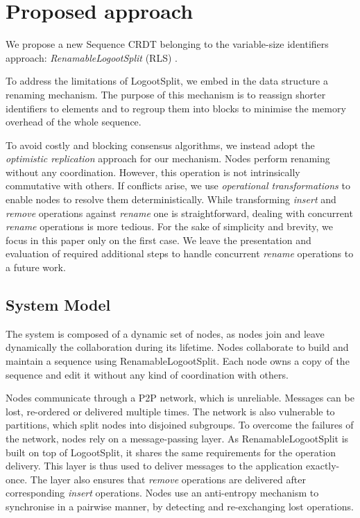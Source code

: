 \documentclass[sigplan,10pt]{acmart}
\begin{document}
\section{Proposed approach}
\label{sec:proposition}

We propose a new Sequence \ac{CRDT} belonging to the variable-size identifiers approach: \emph{RenamableLogootSplit} (RLS) \cite{nicolas:hal-01932552}.

To address the limitations of LogootSplit, we embed in the data structure a renaming mechanism.
The purpose of this mechanism is to reassign shorter identifiers to elements and to regroup them into blocks to minimise the memory overhead of the whole sequence.

To avoid costly and blocking consensus algorithms, we instead adopt the \emph{optimistic replication} \cite{10.1145/1057977.1057980} approach for our mechanism.
Nodes perform renaming without any coordination.
However, this operation is not intrinsically commutative with others.
If conflicts arise, we use \emph{operational transformations} \cite{10.1145/289444.289469,4668339} to enable nodes to resolve them deterministically.
While transforming \emph{insert} and \emph{remove} operations against \emph{rename} one is straightforward, dealing with concurrent \emph{rename} operations is more tedious.
For the sake of simplicity and brevity, we focus in this paper only on the first case.
We leave the presentation and evaluation of required additional steps to handle concurrent \emph{rename} operations to a future work.

\subsection{System Model}

The system is composed of a dynamic set of nodes, as nodes join and leave dynamically the collaboration during its lifetime.
Nodes collaborate to build and maintain a sequence using RenamableLogootSplit.
Each node owns a copy of the sequence and edit it without any kind of coordination with others.

Nodes communicate through a \ac{P2P} network, which is unreliable.
Messages can be lost, re-ordered or delivered multiple times.
The network is also vulnerable to partitions, which split nodes into disjoined subgroups.
To overcome the failures of the network, nodes rely on a message-passing layer.
As RenamableLogootSplit is built on top of LogootSplit, it shares the same requirements for the operation delivery.
This layer is thus used to deliver messages to the application exactly-once.
The layer also ensures that \emph{remove} operations are delivered after corresponding \emph{insert} operations.
Nodes use an anti-entropy mechanism to synchronise in a pairwise manner, by detecting and re-exchanging lost operations.
\end{document}
